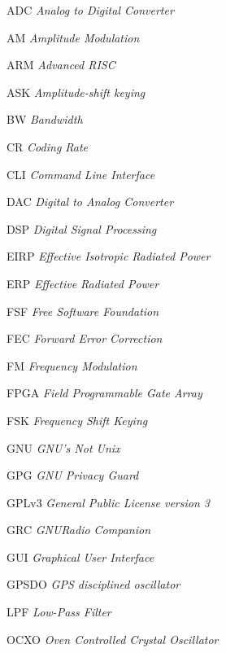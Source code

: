 \documentclass[
  12pt,				%
  openright,			%
  twoside,			%
  a4paper,			%
  english,			%
  french,				%
  spanish,			%
  brazil,				%
  ]{abntex2}
\begin{document}
\listoffigures*
\cleardoublepage

\listoftables*
\cleardoublepage

\begin{siglas}

  \item[ADC]         \textit{Analog to Digital Converter}
  \item[AM]         \textit{Amplitude Modulation}
  \item[ARM]        \textit{Advanced RISC}
  \item[ASK]        \textit{Amplitude-shift keying}
  \item[BW]         \textit{Bandwidth}
  \item[CR]         \textit{Coding Rate}
  \item[CLI]        \textit{Command Line Interface}
  \item[DAC]        \textit{Digital to Analog Converter}
  \item[DSP]        \textit{Digital Signal Processing}
  \item[EIRP]       \textit{Effective Isotropic Radiated Power}
  \item[ERP]        \textit{Effective Radiated Power}
  \item[FSF]        \textit{Free Software Foundation}
  \item[FEC]        \textit{Forward Error Correction}
  \item[FM]         \textit{Frequency Modulation}
  \item[FPGA]       \textit{Field Programmable Gate Array}
  \item[FSK]        \textit{Frequency Shift Keying}
  \item[GNU]        \textit{GNU's Not Unix}
  \item[GPG]        \textit{GNU Privacy Guard}
  \item[GPLv3]      \textit{General Public License version 3}
  \item[GRC]        \textit{GNURadio Companion}
  \item[GUI]        \textit{Graphical User Interface}
  \item[GPSDO]      \textit{GPS disciplined oscillator}
  \item[LPF]         \textit{Low-Pass Filter}
  \item[OCXO]       \textit{Oven Controlled Crystal Oscillator}

\end{siglas}
\end{document}
